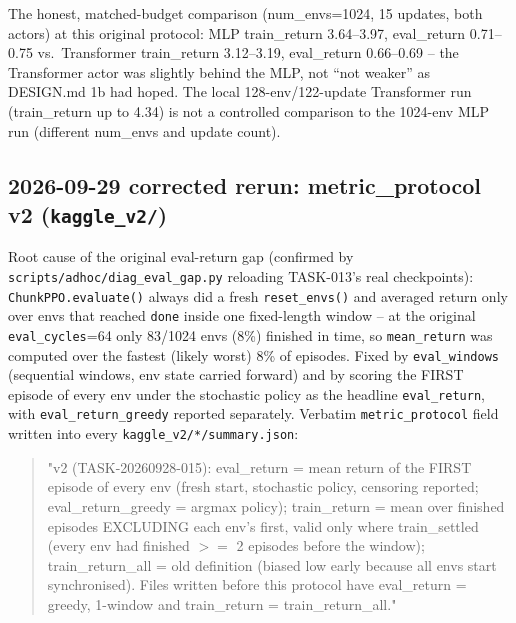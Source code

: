 \documentclass[11pt]{article}
\newcommand{\srcpath}[1]{\texttt{\small #1}}
\begin{document}
The honest, matched-budget comparison (num\_envs=1024, 15 updates, both actors) at this original
protocol: MLP train\_return 3.64--3.97, eval\_return 0.71--0.75 vs.\ Transformer train\_return
3.12--3.19, eval\_return 0.66--0.69 -- the Transformer actor was slightly behind the MLP, not ``not
weaker'' as DESIGN.md 1b had hoped. The local 128-env/122-update Transformer run (train\_return up
to 4.34) is not a controlled comparison to the 1024-env MLP run (different num\_envs and update
count).

\subsection{2026-09-29 corrected rerun: metric\_protocol v2 (\texttt{kaggle\_v2/})}
\label{sec:latency-v2}

Root cause of the original eval-return gap (confirmed by \srcpath{scripts/adhoc/diag\_eval\_gap.py}
reloading TASK-013's real checkpoints): \texttt{ChunkPPO.evaluate()} always did a fresh
\texttt{reset\_envs()} and averaged return only over envs that reached \texttt{done} inside one
fixed-length window -- at the original \texttt{eval\_cycles}=64 only 83/1024 envs (8\%) finished in
time, so \texttt{mean\_return} was computed over the fastest (likely worst) 8\% of episodes. Fixed
by \texttt{eval\_windows} (sequential windows, env state carried forward) and by scoring the FIRST
episode of every env under the stochastic policy as the headline \texttt{eval\_return}, with
\texttt{eval\_return\_greedy} reported separately. Verbatim \texttt{metric\_protocol} field written
into every \srcpath{kaggle\_v2/*/summary.json}:
\begin{quote}\small\ttfamily
"v2 (TASK-20260928-015): eval\_return = mean return of the FIRST episode of every env (fresh start,
stochastic policy, censoring reported; eval\_return\_greedy = argmax policy); train\_return = mean
over finished episodes EXCLUDING each env's first, valid only where train\_settled (every env had
finished $>=$ 2 episodes before the window); train\_return\_all = old definition (biased low early
because all envs start synchronised). Files written before this protocol have eval\_return = greedy,
1-window and train\_return = train\_return\_all."
\end{quote}
\end{document}

